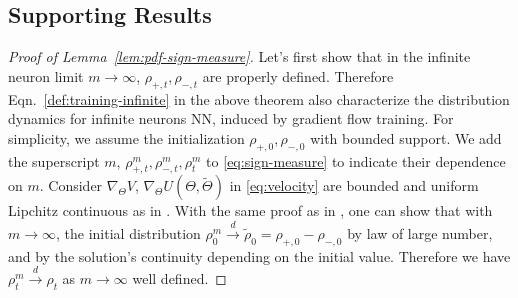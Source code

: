 \documentclass[11pt]{article}
\numberwithin{equation}{section}
\begin{document}
\subsection{Supporting Results}

\begin{proof}[Proof of Lemma~\ref{lem:pdf-sign-measure}]
	Let's first show that in the infinite neuron limit $m \rightarrow \infty$, $\rho_{+, t}, \rho_{-, t}$ are properly defined. Therefore Eqn.~\eqref{def:training-infinite} in the above theorem also characterize the distribution dynamics for infinite neurons NN, induced by gradient flow training. For simplicity, we assume the initialization $\rho_{+,0},\rho_{-,0}$ with bounded support. We add the superscript $m$, $\rho_{+,t}^m, \rho_{-,t}^m,\rho_{t}^m$ to \eqref{eq:sign-measure} to indicate their dependence on $m$. Consider $\nabla_\Theta V$, $\nabla_{\Theta}U(\Theta,\tilde \Theta)$ in \eqref{eq:velocity} are bounded and uniform Lipchitz continuous as in \cite[A3]{mei2018mean}. With the same proof as in \cite[Theorem 3]{mei2018mean}, one can show that with $m\rightarrow \infty$, the initial distribution $\rho^m_0 \xrightarrow{d} \tilde \rho_0 = \rho_{+,0} - \rho_{-,0}$ by law of large number, and by the solution's continuity depending on the initial value. Therefore we have $\rho_t^m \xrightarrow{d} \rho_t$ as $m\rightarrow \infty$ well defined.



\end{proof}
\end{document}
